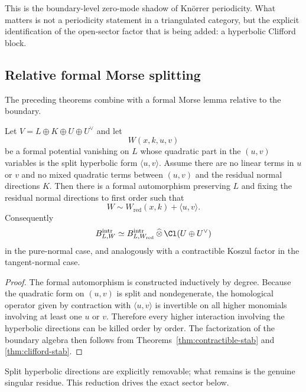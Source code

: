 \begin{remark}
This is the boundary-level zero-mode shadow of Kn\"orrer periodicity. What matters is not a periodicity statement in a triangulated category, but the explicit identification of the open-sector factor that is being added: a hyperbolic Clifford block.
\end{remark}

\subsection{Relative formal Morse splitting}

The preceding theorems combine with a formal Morse lemma relative to the boundary.

\begin{theorem}\label{thm:relative-morse}
Let $V=L\oplus K\oplus U\oplus U^\vee$ and let
\[
W(x,k,u,v)
\]
be a formal potential vanishing on $L$ whose quadratic part in the $(u,v)$ variables is the split hyperbolic form $\langle u,v\rangle$. Assume there are no linear terms in $u$ or $v$ and no mixed quadratic terms between $(u,v)$ and the residual normal directions $K$. Then there is a formal automorphism preserving $L$ and fixing the residual normal directions to first order such that
\[
W \sim W_{\mathrm{red}}(x,k)+\langle u,v\rangle.
\]
Consequently
\[
B^\intr_{L,W}
\simeq
B^\intr_{L,W_{\mathrm{red}}}\,\widehat{\otimes}\,\Cl(U\oplus U^\vee)
\]
in the pure-normal case, and analogously with a contractible Koszul factor in the tangent-normal case.
\end{theorem}

\begin{proof}
The formal automorphism is constructed inductively by degree. Because the quadratic form on $(u,v)$ is split and nondegenerate, the homological operator given by contraction with $\langle u,v\rangle$ is invertible on all higher monomials involving at least one $u$ or $v$. Therefore every higher interaction involving the hyperbolic directions can be killed order by order. The factorization of the boundary algebra then follows from Theorems~\ref{thm:contractible-stab} and \ref{thm:clifford-stab}.
\end{proof}

\begin{remark}
Split hyperbolic directions are explicitly removable; what remains is the genuine singular residue. This reduction drives the exact sector below.
\end{remark}


